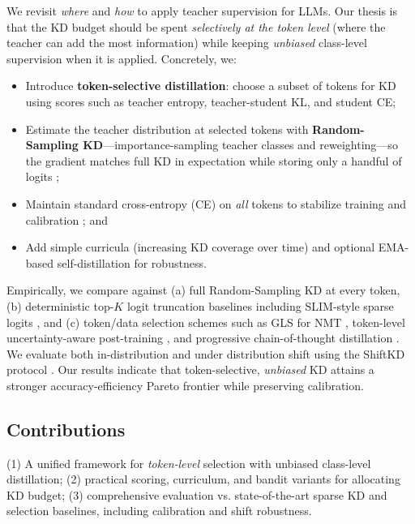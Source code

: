 \documentclass[11pt]{article}
\begin{document}
We revisit \emph{where} and \emph{how} to apply teacher supervision for LLMs. Our thesis is that the KD budget should be spent \emph{selectively at the token level} (where the teacher can add the most information) while keeping \emph{unbiased} class-level supervision when it is applied. Concretely, we:

\begin{itemize}
	\item Introduce \textbf{token-selective distillation}: choose a subset of tokens for KD using scores such as teacher entropy, teacher-student KL, and student CE;
	\item Estimate the teacher distribution at selected tokens with \textbf{Random-Sampling KD}---importance-sampling teacher classes and reweighting---so the gradient matches full KD in expectation while storing only a handful of logits \citep{anshumann2025sparse};
	\item Maintain standard cross-entropy (CE) on \emph{all} tokens to stabilize training and calibration \citep{guo2017calibration}; and
	\item Add simple curricula (increasing KD coverage over time) and optional EMA-based self-distillation for robustness.
\end{itemize}

Empirically, we compare against (a) full Random-Sampling KD at every token, (b) deterministic top-$K$ logit truncation baselines including SLIM-style sparse logits \citep{raman2023slim}, and (c) token/data selection schemes such as GLS for NMT \citep{wang2021selectivekd}, token-level uncertainty-aware post-training \citep{liu2025tokenlevel}, and progressive chain-of-thought distillation \citep{feng2024kpod}. We evaluate both in-distribution and under distribution shift using the ShiftKD protocol \citep{zhang2023shiftkd}. Our results indicate that token-selective, \emph{unbiased} KD attains a stronger accuracy-efficiency Pareto frontier while preserving calibration.

\subsection{Contributions} (1) A unified framework for \emph{token-level} selection with unbiased class-level distillation; (2) practical scoring, curriculum, and bandit variants for allocating KD budget; (3) comprehensive evaluation vs. state-of-the-art sparse KD and selection baselines, including calibration and shift robustness.
\end{document}
